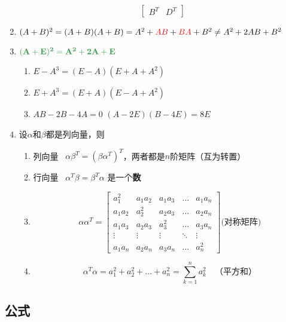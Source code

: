 \documentclass[a4paper,12pt]{article}
\begin{document}
\begin{enumerate}
\[\begin{bmatrix}
                  B^T & D^T
            \end{bmatrix}
        \]
        \item $(A + B)^2 = (A + B)(A + B) = A^2 + {\color{red}{AB}} + {\color{red}{BA}} + B^2 \;\mathbf{\neq}\; A^2 + 2AB + B^2$
        \item $\color[rgb]{0.2, 0.6, 0.3}{\mathbf{(A + E)^2 = A^2 + 2A + E}}$
        \begin{enumerate}
            \item $E - A^3 = (E - A)(E + A + A^2)$
            \item $E + A^3 = (E + A)(E - A + A^2)$
            \item $AB - 2B - 4A = 0$ \Leftrightarrow \; $(A - 2E)(B - 4E) = 8E$
        \end{enumerate}
        \item 设$\alpha$和$\beta$都是列向量，则
        \begin{enumerate}
            \item 列向量 \cdot {} \, $\alpha\beta^T = (\beta\alpha^T)^T$，两者都是$n$阶矩阵（互为转置）
            \item 行向量 \cdot {} \, $\alpha^T\beta = \beta^T\alpha$ 是一个\textbf{数}
            \item
            \[
                \alpha\alpha^T =
                \begin{bmatrix}
                    a_1^2   & a_1 a_2 & a_1 a_3 & \dots  & a_1 a_n \\
                    a_1 a_2 & a_2^2   & a_2 a_3 & \dots  & a_2 a_n \\
                    a_1 a_3 & a_2 a_3 & a_3^2   & \dots  & a_3 a_n \\
                    \vdots  & \vdots  & \vdots  & \ddots & \vdots  \\
                    a_1 a_n & a_2 a_n & a_3 a_n & \dots  & a_n^2
                \end{bmatrix} \text{(对称矩阵)}
            \]
            \item
            \[
                \alpha^T \alpha = a_1^2 + a_2^2 + \dots + a_n^2 = \sum_{k=1}^{n} a_k^2 \quad \text{（平方和）}
            \]
        \end{enumerate}
    \end{enumerate}

    \subsection{公式}
\end{document}
